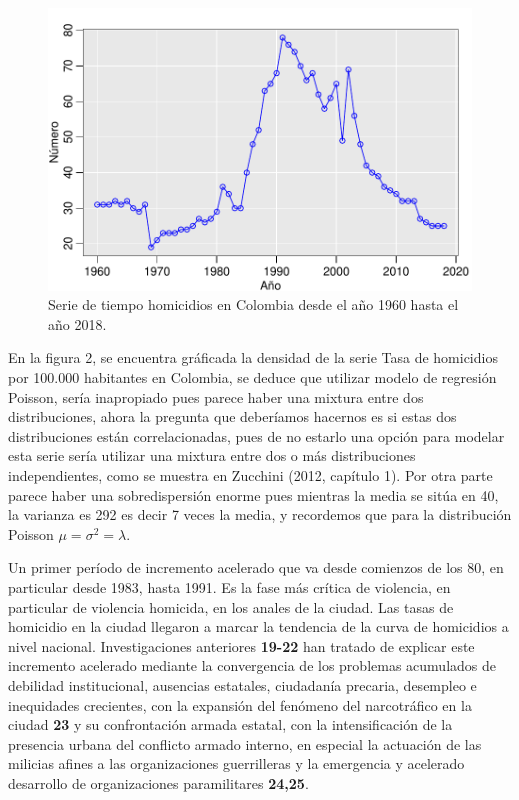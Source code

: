 \documentclass[a4paper]{article}\usepackage[]{graphicx}\usepackage[]{color}
\makeatletter
\def\maxwidth{ %
  \ifdim\Gin@nat@width>\linewidth
    \linewidth
  \else
    \Gin@nat@width
  \fi
}
\newenvironment{knitrout}{}{} %
\makeatother
\begin{document}
\begin{knitrout}
\color{fgcolor}\begin{figure}
\includegraphics[width=\maxwidth]{figure/unnamed-chunk-7-1} \caption[Serie de tiempo homicidios en Colombia desde el año 1960 hasta el año 2018]{Serie de tiempo homicidios en Colombia desde el año 1960 hasta el año 2018.}\label{fig:unnamed-chunk-7}
\end{figure}


\end{knitrout}

En la figura 2, se encuentra gráficada la densidad de la serie Tasa de homicidios por 100.000 habitantes en Colombia, se deduce que utilizar modelo de regresión Poisson, sería inapropiado pues parece haber una mixtura entre dos distribuciones, ahora la pregunta que deberíamos hacernos es si estas dos distribuciones están correlacionadas, pues de no estarlo una opción para modelar esta serie sería utilizar una mixtura entre dos o más distribuciones independientes, como se muestra en Zucchini (2012, capítulo 1). Por otra parte parece haber una sobredispersión enorme pues mientras la media se sitúa en 40, la varianza es 292 es decir 7 veces la media, y recordemos que para la distribución Poisson $\mu = \sigma^2 = \lambda$. 

Un primer período de incremento acelerado que va desde comienzos de los 80, en particular desde 1983, hasta 1991. Es la fase más crítica de violencia, en particular de violencia homicida, en los anales de la ciudad. Las tasas de homicidio en la ciudad llegaron a marcar la tendencia de la curva de homicidios a nivel nacional. Investigaciones anteriores \textbf{19-22} han tratado de explicar este incremento acelerado mediante la convergencia de los problemas acumulados de debilidad institucional, ausencias estatales, ciudadanía precaria, desempleo e inequidades crecientes, con la expansión del fenómeno del narcotráfico en la ciudad \textbf{23} y su confrontación armada estatal, con la intensificación de la presencia urbana del conflicto armado interno, en especial la actuación de las milicias afines a las organizaciones guerrilleras y la emergencia y acelerado desarrollo de organizaciones paramilitares \textbf{24,25}.
\end{document}
